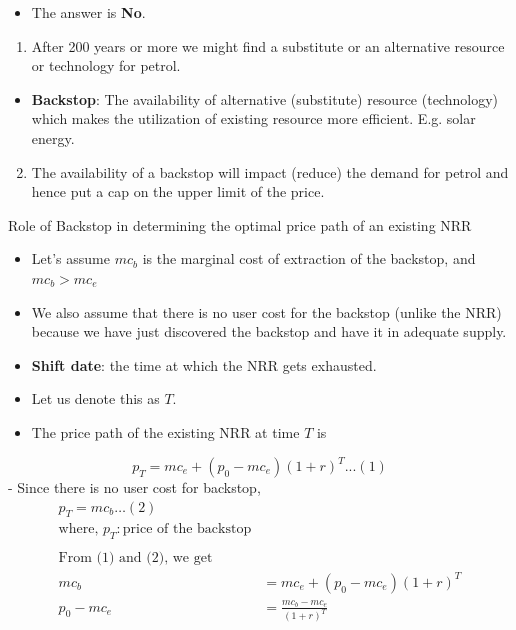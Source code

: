 \documentclass[
  ignorenonframetext,
]{beamer}
\providecommand{\tightlist}{%
  \setlength{\itemsep}{0pt}\setlength{\parskip}{0pt}}\usepackage{longtable,booktabs,array}
\begin{document}
\begin{frame}
\begin{itemize}
\tightlist
\item
  The answer is \textbf{No}.
\end{itemize}

\begin{enumerate}
\tightlist
\item
  After 200 years or more we might find a substitute or an alternative
  resource or technology for petrol.
\end{enumerate}

\begin{itemize}
\tightlist
\item
  \textbf{Backstop}: The availability of alternative (substitute)
  resource (technology) which makes the utilization of existing resource
  more efficient. E.g. solar energy.
\end{itemize}

\begin{enumerate}
\setcounter{enumi}{1}
\tightlist
\item
  The availability of a backstop will impact (reduce) the demand for
  petrol and hence put a cap on the upper limit of the price.
\end{enumerate}
\end{frame}

\begin{frame}{Role of Backstop in determining the optimal price path of
an existing NRR}
\label{role-of-backstop-in-determining-the-optimal-price-path-of-an-existing-nrr}
\begin{itemize}
\tightlist
\item
  Let's assume \(mc_b\) is the marginal cost of extraction of the
  backstop, and \(mc_b > mc_e\)
\item
  We also assume that there is no user cost for the backstop (unlike the
  NRR) because we have just discovered the backstop and have it in
  adequate supply.
\end{itemize}
\end{frame}

\begin{frame}
\begin{itemize}
\tightlist
\item
  \textbf{Shift date}: the time at which the NRR gets exhausted.
\item
  Let us denote this as \(T\).
\item
  The price path of the existing NRR at time \(T\) is
\end{itemize}

\[
p_T = mc_e + (p_0 - mc_e)(1 + r)^T ... (1)
\] - Since there is no user cost for backstop, \[
\begin{align}
p_T = mc_b \ldots (2)\\
\text{where, } p_T:\text{price of the backstop}\\
\\
\text{From (1) and (2), we get}\\
mc_b &= mc_e + (p_0 - mc_e)(1+r)^T\\
p_0 - mc_e &= \frac{mc_b-mc_e}{(1+r)^T}
\end{align}
\]
\end{frame}

\begin{frame}
\end{frame}
\end{document}

